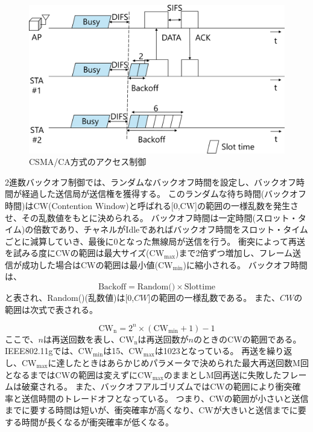 \documentclass[a4paper,10.5pt]{ltjsarticle}
\begin{document}
\begin{figure}[H]
  \centering
  \includegraphics[width=\linewidth]{CSMACA.pdf} %
  \caption{CSMA/CA方式のアクセス制御}
  \label{fig:CSMA/CA} %
\end{figure}



2進数バックオフ制御では、ランダムなバックオフ時間を設定し、バックオフ時間が経過した送信局が送信権を獲得する。
このランダムな待ち時間(バックオフ時間)はCW(Contention Window)と呼ばれる[0,$\mathrm{CW}$]の範囲の一様乱数を発生させ、その乱数値をもとに決められる。
バックオフ時間は一定時間(スロット・タイム)の倍数であり、チャネルがIdleであればバックオフ時間をスロット・タイムごとに減算していき、最後に0となった無線局が送信を行う。
衝突によって再送を試みる度に$\mathrm{CW}$の範囲は最大サイズ($\mathrm{CW_{\max}}$)まで2倍ずつ増加し、フレーム送信が成功した場合は$\mathrm{CW}$の範囲は最小値($\mathrm{CW_{\min}}$)に縮小される。
バックオフ時間は、
\begin{equation}
 \text{Backoff}  = \text{Random()} \times \text{Slottime}
\end{equation}
と表され、Random()(乱数値)は[0,$CW$]の範囲の一様乱数である。
また、$CW$の範囲は次式で表される。


\begin{equation}
  \mathrm{CW_n} = 2^{n} \times (\mathrm{CW_{\min}}+1)-1
  \label{eq:CW}
\end{equation}
ここで、$n$は再送回数を表し、$\mathrm{CW_n}$は再送回数が$n$のときの$\mathrm{CW}$の範囲である。
IEEE802.11gでは、$\mathrm{CW_{\min}}$は15、$\mathrm{CW_{\max}}$は1023となっている。
再送を繰り返し、$\mathrm{CW_{\max}}$に達したときはあらかじめパラメータで決められた最大再送回数M回となるまでは$\mathrm{CW}$の範囲は変えずに$\mathrm{CW_{\max}}$のままとしM回再送に失敗したフレームは破棄される。
また、バックオフアルゴリズムでは$\mathrm{CW}$の範囲により衝突確率と送信時間のトレードオフとなっている。
つまり、$\mathrm{CW}$の範囲が小さいと送信までに要する時間は短いが、衝突確率が高くなり、$\mathrm{CW}$が大きいと送信までに要する時間が長くなるが衝突確率が低くなる。
\end{document}
